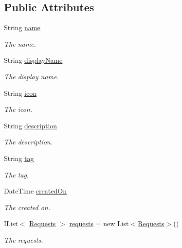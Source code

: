 \subsection*{Public Attributes}
\begin{DoxyCompactItemize}
\item 
String \hyperlink{classcom_1_1shephertz_1_1app42_1_1paas_1_1sdk_1_1csharp_1_1gift_1_1_gift_ae4132aedea027842f094bd185626b949}{name}
\begin{DoxyCompactList}\small\item\em The name. \end{DoxyCompactList}\item 
String \hyperlink{classcom_1_1shephertz_1_1app42_1_1paas_1_1sdk_1_1csharp_1_1gift_1_1_gift_a58ec6179bf665e288fb23d2f5f569ac5}{display\+Name}
\begin{DoxyCompactList}\small\item\em The display name. \end{DoxyCompactList}\item 
String \hyperlink{classcom_1_1shephertz_1_1app42_1_1paas_1_1sdk_1_1csharp_1_1gift_1_1_gift_a890e1461198dc6f8a0afa5a0d5be91d8}{icon}
\begin{DoxyCompactList}\small\item\em The icon. \end{DoxyCompactList}\item 
String \hyperlink{classcom_1_1shephertz_1_1app42_1_1paas_1_1sdk_1_1csharp_1_1gift_1_1_gift_a8c625ce83db7304c60bbec6d52fc1040}{description}
\begin{DoxyCompactList}\small\item\em The description. \end{DoxyCompactList}\item 
String \hyperlink{classcom_1_1shephertz_1_1app42_1_1paas_1_1sdk_1_1csharp_1_1gift_1_1_gift_a3d2e74c8a0a4ccb247b36e3bc82ec7e9}{tag}
\begin{DoxyCompactList}\small\item\em The tag. \end{DoxyCompactList}\item 
Date\+Time \hyperlink{classcom_1_1shephertz_1_1app42_1_1paas_1_1sdk_1_1csharp_1_1gift_1_1_gift_a86191b80a09d2d07ddefad69aefb21eb}{created\+On}
\begin{DoxyCompactList}\small\item\em The created on. \end{DoxyCompactList}\item 
I\+List$<$ \hyperlink{classcom_1_1shephertz_1_1app42_1_1paas_1_1sdk_1_1csharp_1_1gift_1_1_gift_1_1_requests}{Requests} $>$ \hyperlink{classcom_1_1shephertz_1_1app42_1_1paas_1_1sdk_1_1csharp_1_1gift_1_1_gift_afc7c41de2afc7134dc150ea833d71db5}{requests} = new List$<$\hyperlink{classcom_1_1shephertz_1_1app42_1_1paas_1_1sdk_1_1csharp_1_1gift_1_1_gift_1_1_requests}{Requests}$>$()
\begin{DoxyCompactList}\small\item\em The requests. \end{DoxyCompactList}\end{DoxyCompactItemize}


